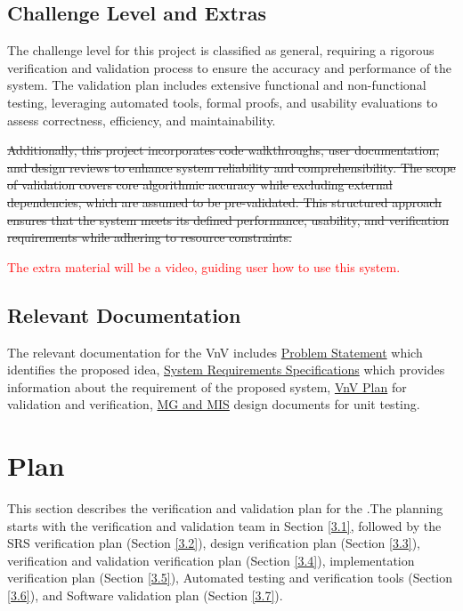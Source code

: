 \documentclass[12pt, titlepage]{article}
\newcommand{\add}{\textcolor{red}}
\begin{document}
\subsection{Challenge Level and Extras}
The challenge level for this project is classified as general, requiring a
rigorous verification and validation process to ensure the accuracy and
performance of the system. The validation plan includes extensive functional and non-functional
testing, leveraging automated tools, formal proofs, and usability evaluations to
assess correctness, efficiency, and maintainability.

\st{Additionally, this project incorporates code walkthroughs, user documentation,
and design reviews to enhance system reliability and comprehensibility. The
scope of validation covers core algorithmic accuracy while excluding external
dependencies, which are assumed to be pre-validated. This structured approach
ensures that the system meets its defined performance, usability, and
verification requirements while adhering to resource constraints.
}

\add{The extra material will be a video, guiding user how to use this system.}

\subsection{Relevant Documentation}
The relevant documentation for the VnV includes
\href{https://github.com/marischan888/Computed-Tomography-Image-Reconstruction/blob/main/docs/ProblemStatementAndGoals/ProblemStatement.pdf}{Problem
  Statement} which identifies the proposed idea,
\href{https://github.com/marischan888/Computed-Tomography-Image-Reconstruction/blob/main/docs/SRS/SRS.pdf}{System
  Requirements Specifications} which provides information about the requirement
of the proposed system, \href{https://github.com/marischan888/FBP-CT/tree/main/docs/VnVPlan}{VnV Plan} for validation and verification, \href{https://github.com/marischan888/FBP-CT/tree/main/docs/Design}{MG and MIS}
design documents for unit testing.

\section{Plan} \label{sec3}
This section describes the verification and validation plan for the
\progname.The planning starts with the verification and validation team in
Section \ref{3.1}, followed by the SRS verification plan (Section \ref{3.2}),
design verification plan (Section \ref{3.3}), verification and validation
verification plan (Section \ref{3.4}), implementation verification plan (Section
\ref{3.5}), Automated testing and verification tools (Section \ref{3.6}), and
Software validation plan (Section \ref{3.7}).
\end{document}
